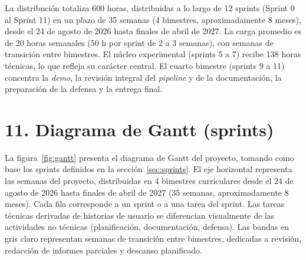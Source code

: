 \documentclass[
  11pt, %
]{charter}
\begin{document}
La distribución totaliza 600 horas, distribuidas a lo largo de 12 sprints (Sprint 0 al Sprint 11) en un plazo de 35 semanas (4 bimestres, aproximadamente 8 meses), desde el 24 de agosto de 2026 hasta finales de abril de 2027. La carga promedio es de 20 horas semanales (50 h por sprint de 2 a 3 semanas), con semanas de transición entre bimestres. El núcleo experimental (sprints 5 a 7) recibe 138 horas técnicas, lo que refleja su carácter central. El cuarto bimestre (sprints 9 a 11) concentra la \textit{demo}, la revisión integral del \textit{pipeline} y de la documentación, la preparación de la defensa y la entrega final.

\section{11. Diagrama de Gantt (sprints)}
\label{sec:gantt}

La figura~\ref{fig:gantt} presenta el diagrama de Gantt del proyecto, tomando como base los sprints definidos en la sección~\ref{sec:sprints}. El eje horizontal representa las semanas del proyecto, distribuidas en 4 bimestres curriculares desde el 24 de agosto de 2026 hasta finales de abril de 2027 (35 semanas, aproximadamente 8 meses). Cada fila corresponde a un sprint o a una tarea del sprint. Las tareas técnicas derivadas de historias de usuario se diferencian visualmente de las actividades no técnicas (planificación, documentación, defensa). Las bandas en gris claro representan semanas de transición entre bimestres, dedicadas a revisión, redacción de informes parciales y descanso planificado.
\end{document}
